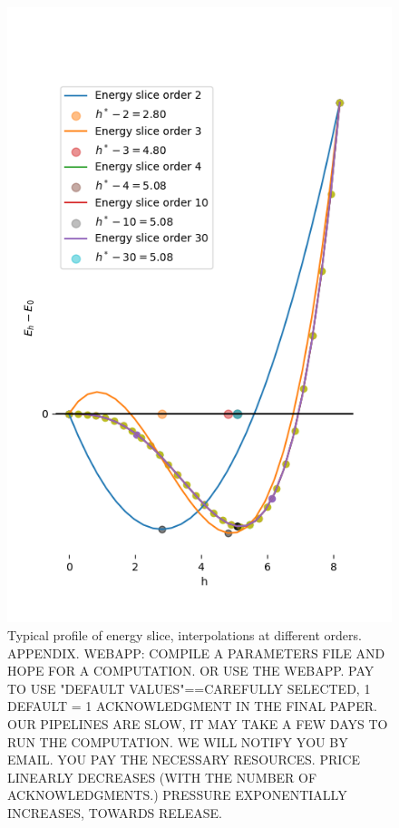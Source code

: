 
\begin{figure}[htbp]
    \centering
    \includegraphics*[width=.45\textwidth]{../images/energy_interpolation-orders.png}
    \caption{Typical profile of energy slice, interpolations at different orders. APPENDIX. WEBAPP: COMPILE A PARAMETERS FILE AND HOPE FOR A COMPUTATION. OR USE THE WEBAPP. PAY TO USE "DEFAULT VALUES"==CAREFULLY SELECTED, 1 DEFAULT = 1 ACKNOWLEDGMENT IN THE FINAL PAPER. OUR PIPELINES ARE SLOW, IT MAY TAKE A FEW DAYS TO RUN THE COMPUTATION. WE WILL NOTIFY YOU BY EMAIL. YOU PAY THE NECESSARY RESOURCES. PRICE LINEARLY DECREASES (WITH THE NUMBER OF ACKNOWLEDGMENTS.) PRESSURE EXPONENTIALLY INCREASES, TOWARDS RELEASE.}
    \label{fig:energy-slice}
\end{figure}

